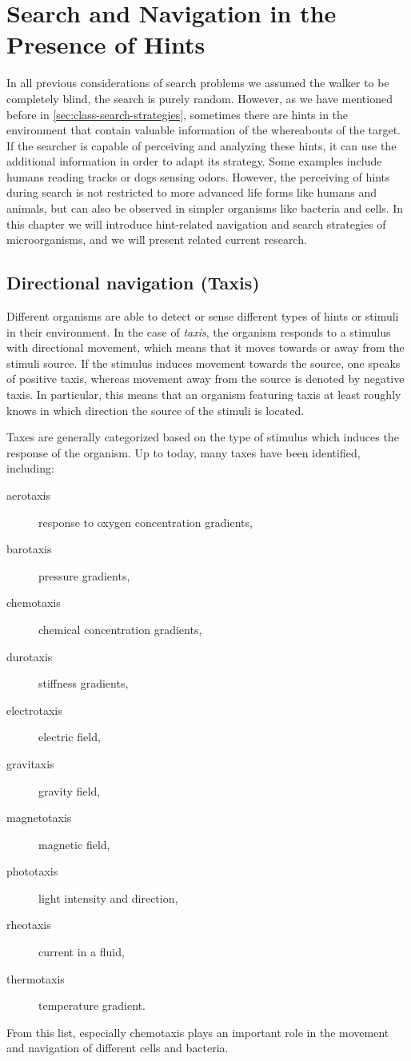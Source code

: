 \chapter{Search and Navigation in the Presence of Hints}\label{ch:hints}
In all previous considerations of search problems we assumed the walker to be completely blind, \ie the search is purely random. However, as we have mentioned before in \autoref{sec:class-search-strategies}, sometimes there are hints in the environment that contain valuable information of the whereabouts of the target. If the searcher is capable of perceiving and analyzing these hints, it can use the additional information in order to adapt its strategy. Some examples include \eg humans reading tracks or dogs sensing odors. However, the perceiving of hints during search is not restricted to more advanced life forms like humans and animals, but can also be observed in simpler organisms like bacteria and cells. In this chapter we will introduce hint-related navigation and search strategies of microorganisms, and we will present related current research.

\section{Directional navigation (Taxis)}
Different organisms are able to detect or sense different types of hints or stimuli in their environment. In the case of \textit{taxis}, the organism responds to a stimulus with directional movement, which means that it moves towards or away from the stimuli source. If the stimulus induces movement towards the source, one speaks of positive taxis, whereas movement away from the source is denoted by negative taxis. In particular, this means that an organism featuring taxis at least roughly knows in which direction the source of the stimuli is located.

Taxes are generally categorized based on the type of stimulus which induces the response of the organism. Up to today, many taxes have been identified, including:
\begin{description}
 \item[aerotaxis] response to oxygen concentration gradients,
 \item[barotaxis] pressure gradients,
 \item[chemotaxis] chemical concentration gradients,
 \item[durotaxis] stiffness gradients,
 \item[electrotaxis] electric field,
 \item[gravitaxis] gravity field,
 \item[magnetotaxis] magnetic field,
 \item[phototaxis] light intensity and direction,
 \item[rheotaxis] current in a fluid,
 \item[thermotaxis] temperature gradient.
\end{description}
From this list, especially chemotaxis plays an important role in the movement and navigation of different cells and bacteria.

